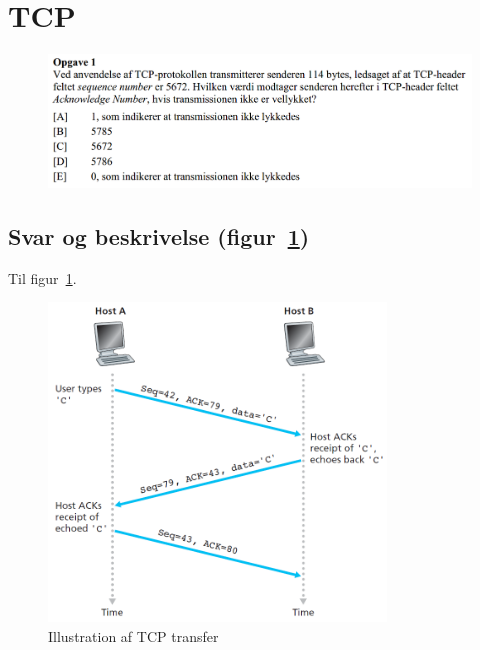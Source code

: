 \section{TCP}

\begin{figure}[H]
	\centering
	\includegraphics[width=\linewidth]{figs/sommer15/SE15OP1}
	\caption{}
	\label{fig:SE15OP1}
\end{figure}

\subsection{Svar og beskrivelse (figur~\ref{fig:SE15OP1})}

Til figur~\ref{fig:SE15OP1}.
\derp

\begin{figure}[H]
	\centering
	\includegraphics[width=0.8\textwidth]{figs/sommer15/tcptransfer}
	\caption{Illustration af TCP transfer}
	\label{fig:TCPtransfer}
\end{figure}


